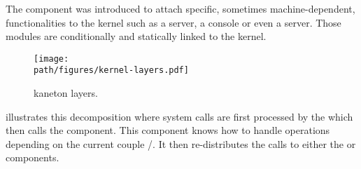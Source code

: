 The  component was introduced to attach specific, sometimes
machine-dependent, functionalities to the kernel such as a
 server, a console or even a  server. Those
modules are conditionally and statically linked to the kernel.

\begin{figure}[h]
  \begin{center}
    \texttt{[image: \\path/figures/kernel-layers.pdf]}
    \caption{kaneton layers.}
    \label{figure:kernel-layers}
  \end{center}
\end{figure}

 illustrates this decomposition
where system calls are first processed by the  which then calls the
 component. This component knows how to handle operations depending
on the current couple /. It then
re-distributes the calls to either the  or 
components.
